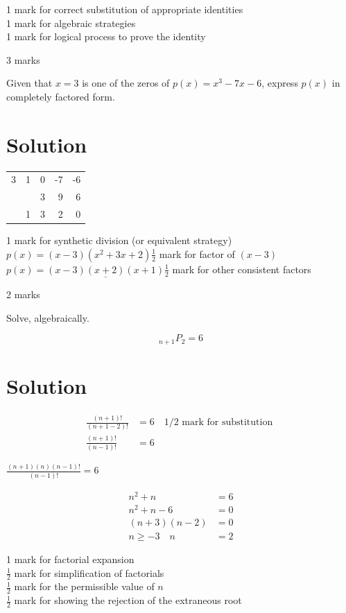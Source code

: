 \documentclass[10pt]{article}
\begin{document}
1 mark for correct substitution of appropriate identities\\
1 mark for algebraic strategies\\
1 mark for logical process to prove the identity

3 marks

Given that $x=3$ is one of the zeros of $p(x)=x^{3}-7 x-6$, express $p(x)$ in completely factored form.

\section*{Solution}
\begin{center}
\begin{tabular}{l|rrrr}
3 & 1 & 0 & -7 & -6 \\
 &  & 3 & 9 & 6 \\
\hline
 & 1 & 3 & 2 & 0 \\
\hline
\end{tabular}
\end{center}

1 mark for synthetic division (or equivalent strategy)\\
$p(x)=(x-3)\left(x^{2}+3 x+2\right) \frac{1}{2}$ mark for factor of $(x-3)$\\
$p(x)=\underline{(x-3)(x+2)(x+1)} \frac{1}{2}$ mark for other consistent factors

2 marks

Solve, algebraically.

$$
{ }_{n+1} P_{2}=6
$$

\section*{Solution}
$$
\begin{aligned}
\frac{(n+1)!}{(n+1-2)!} & =6 \quad 1 / 2 \text { mark for substitution } \\
\frac{(n+1)!}{(n-1)!} & =6
\end{aligned}
$$

$\frac{(n+1)(n)(n-1)!}{(n-1)!}=6$

$$
\begin{aligned}
n^{2}+n & =6 \\
n^{2}+n-6 & =0 \\
(n+3)(n-2) & =0 \\
n \geq-3 \quad n & =2
\end{aligned}
$$

1 mark for factorial expansion\\
$\frac{1}{2}$ mark for simplification of factorials\\
$\frac{1}{2}$ mark for the permissible value of $n$\\
$\frac{1}{2}$ mark for showing the rejection of the extraneous root
\end{document}
